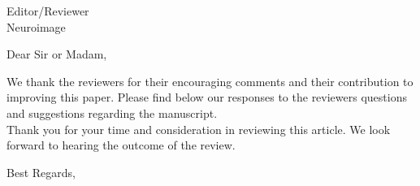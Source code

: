 \documentclass[a4paper,10pt]{letter}
\begin{document}
\vspace{-1cm}
\begin{letter}{Editor/Reviewer \\ Neuroimage}

\opening{Dear Sir or Madam,}


    We thank the reviewers for their encouraging comments and their contribution to improving this paper. Please find below our responses to the reviewers questions and suggestions regarding the manuscript. 
\\

Thank you for your time and consideration in reviewing this article. We look forward to hearing the outcome of the review.

\closing{Best Regards,}


\end{letter}
\end{document}

